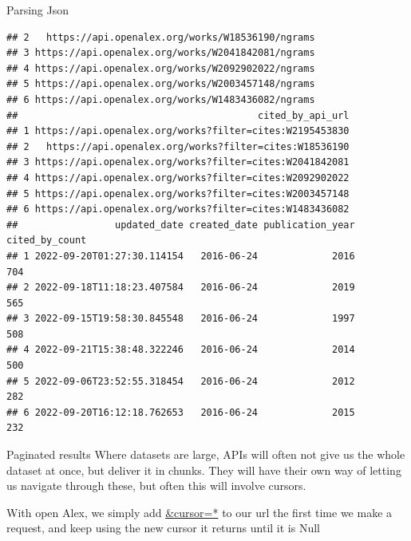 \documentclass[
  10pt,
  ignorenonframetext,
  aspectratio=169]{beamer}
\begin{document}
\begin{frame}[fragile]{Parsing Json}
\begin{verbatim}
## 2   https://api.openalex.org/works/W18536190/ngrams
## 3 https://api.openalex.org/works/W2041842081/ngrams
## 4 https://api.openalex.org/works/W2092902022/ngrams
## 5 https://api.openalex.org/works/W2003457148/ngrams
## 6 https://api.openalex.org/works/W1483436082/ngrams
##                                          cited_by_api_url
## 1 https://api.openalex.org/works?filter=cites:W2195453830
## 2   https://api.openalex.org/works?filter=cites:W18536190
## 3 https://api.openalex.org/works?filter=cites:W2041842081
## 4 https://api.openalex.org/works?filter=cites:W2092902022
## 5 https://api.openalex.org/works?filter=cites:W2003457148
## 6 https://api.openalex.org/works?filter=cites:W1483436082
##                 updated_date created_date publication_year cited_by_count
## 1 2022-09-20T01:27:30.114154   2016-06-24             2016            704
## 2 2022-09-18T11:18:23.407584   2016-06-24             2019            565
## 3 2022-09-15T19:58:30.845548   2016-06-24             1997            508
## 4 2022-09-21T15:38:48.322246   2016-06-24             2014            500
## 5 2022-09-06T23:52:55.318454   2016-06-24             2012            282
## 6 2022-09-20T16:12:18.762653   2016-06-24             2015            232
\end{verbatim}
\end{frame}

\begin{frame}{Paginated results}
\protect\hypertarget{paginated-results}{}
Where datasets are large, APIs will often not give us the whole dataset
at once, but deliver it in chunks. They will have their own way of
letting us navigate through these, but often this will involve cursors.

With open Alex, we simply add \url{&cursor=*} to our url the first time
we make a request, and keep using the new cursor it returns until it is
Null
\end{frame}
\end{document}
